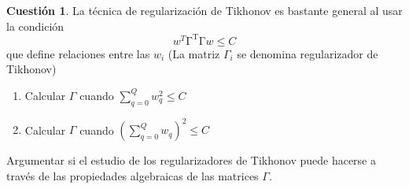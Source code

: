 \documentclass[a4paper, 11pt]{article}
\theoremstyle{definition}
\newtheorem{cuestion}{Cuestión}
\begin{document}
  \begin{cuestion}
    La técnica de regularización de Tikhonov es bastante general al usar la condición
    \[
    w^T\mathrm{\Gamma^T\Gamma}w\leq C
    \]
    que define relaciones entre las $w_i$ (La matriz $\Gamma_i$ se denomina regularizador de Tikhonov)
    \begin{enumerate}
    \item Calcular $\Gamma$ cuando $\sum_{q=0}^Q w_q^2 \leq C$
    \item Calcular $\Gamma$ cuando $(\sum_{q=0}^Q w_q)^2 \leq C$
    \end{enumerate}
    Argumentar si el estudio de los regularizadores de Tikhonov puede hacerse a través de las propiedades algebraicas de las matrices $\Gamma$.
  \end{cuestion}
\end{document}
